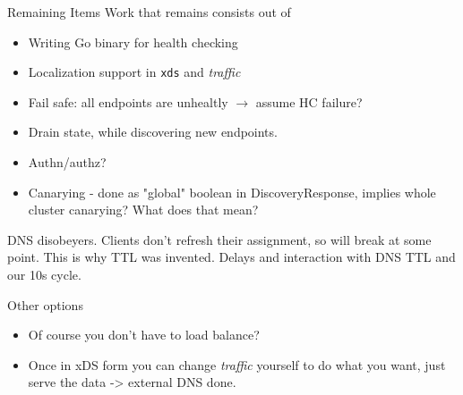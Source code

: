 \documentclass[aspectratio=169]{beamer}
\begin{document}
    \begin{frame}{Remaining Items}
        Work that remains consists out of
        \begin{itemize}
            \item Writing Go binary for health checking
            \item Localization support in \texttt{xds} and \emph{traffic}
            \item Fail safe: all endpoints are unhealtly $\rightarrow$ assume HC failure?
            \item Drain state, while discovering new endpoints.
            \item Authn/authz?
            \item Canarying - done as "global" boolean in DiscoveryResponse, implies whole cluster canarying? What does that mean?
        \end{itemize}

        DNS disobeyers. Clients don't refresh their assignment, so will break at some point.
        This is why TTL was invented.
        Delays and interaction with DNS TTL and our 10s cycle.
    \end{frame}

    \begin{frame}{Other options}
        \begin{itemize}
            \item Of course you don't have to load balance?
            \item Once in xDS form you can change \emph{traffic} yourself to do what you want, just serve
                    the data -> external DNS done.
        \end{itemize}
    \end{frame}
\end{document}
